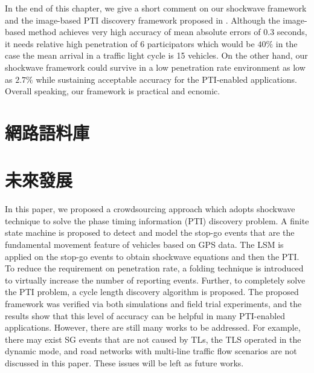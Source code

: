 \documentclass[final,oneside,onecolumn,12pt,a4paper]{book}%
\begin{document}
In the end of this chapter, we give a short comment on our shockwave framework
and the image-based PTI discovery framework proposed in
\cite{Koukoumidis2011SignalGuru}. Although the image-based method achieves
very high accuracy of mean absolute errors of $0.3$ seconds, it needs relative
high penetration of $6$ participators which would be $40\%$ in the case the
mean arrival in a traffic light cycle is 15 vehicles. On the other hand, our
shockwave framework could survive in a low penetration rate environment as low
as $2.7\%$ while sustaining acceptable accuracy for the PTI-enabled
applications. Overall speaking, our framework is practical and ecnomic.

\chapter{網路語料庫}

\chapter{未來發展}

\label{cha:Conclusions} In this paper, we proposed a crowdsourcing approach
which adopts shockwave technique to solve the phase timing information (PTI)
discovery problem. A finite state machine is proposed to detect and model the
stop-go events that are the fundamental movement feature of vehicles based on
GPS data. The LSM is applied on the stop-go events to obtain shockwave
equations and then the PTI. To reduce the requirement on penetration rate, a
folding technique is introduced to virtually increase the number of reporting
events. Further, to completely solve the PTI problem, a cycle length discovery
algorithm is proposed. The proposed framework was verified via both
simulations and field trial experiments, and the results show that this level
of accuracy can be helpful in many PTI-enabled applications. However, there
are still many works to be addressed. For example, there may exist SG events
that are not caused by TLs, the TLS operated in the dynamic mode, and road
networks with multi-line traffic flow scenarios are not discussed in this
paper. These issues will be left as future works.








{}





\bigskip{}
\end{document}
